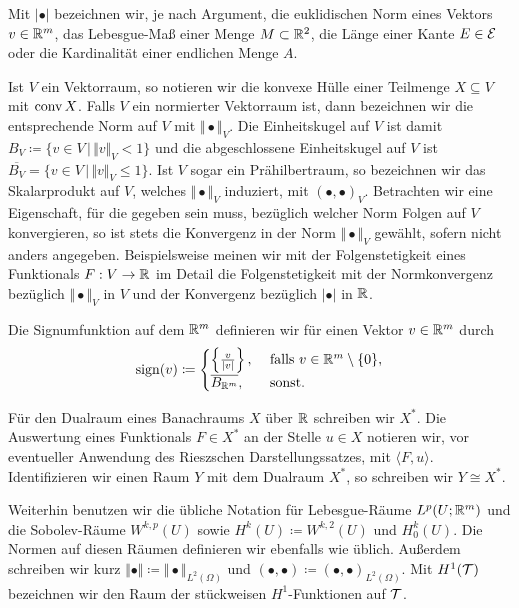 Mit $|\bullet|$ bezeichnen wir, je nach Argument, die euklidischen Norm eines
Vektors $v\in\mathbb{R}^m$, das Lebesgue-Maß einer Menge $M\subset\mathbb{R}^2$, die Länge
einer Kante $E\in\mathcal{E}$ oder die Kardinalität einer endlichen Menge $A$.

Ist $V$ ein Vektorraum, so notieren wir die konvexe Hülle einer Teilmenge
$X\subseteq V$ mit $\textup{conv}\,X$.
Falls $V$ ein normierter Vektorraum ist, dann bezeichnen wir die entsprechende
Norm auf $V$ mit $\Vert\bullet\Vert_V$. 
Die Einheitskugel auf $V$ ist damit $B_V\coloneqq\{v\in V\,|\, \Vert v\Vert_V<
1\}$ und die abgeschlossene Einheitskugel auf $V$ ist
$\overline{B_V}=\{v\in V\,|\, \Vert v\Vert_V\leq 1\}$.
Ist $V$ sogar ein Prähilbertraum, so bezeichnen wir das Skalarprodukt auf
$V$, welches $\Vert\bullet\Vert_V$ induziert, mit $(\bullet,\bullet)_V$.
Betrachten wir eine Eigenschaft, für die gegeben sein muss, bezüglich welcher
Norm Folgen auf $V$ konvergieren, so ist stets die Konvergenz in der Norm
$\Vert\bullet\Vert_V$ gewählt, sofern nicht anders angegeben.
Beispielsweise meinen wir mit der Folgenstetigkeit eines Funktionals
$F:V\to\mathbb{R}$ im Detail die Folgenstetigkeit mit der Normkonvergenz
bezüglich $\Vert\bullet\Vert_V$ in $V$ und der Konvergenz bezüglich $|\bullet|$
in $\mathbb{R}$.

Die Signumfunktion auf dem $\mathbb{R}^m$ definieren wir für einen Vektor
$v\in\mathbb{R}^m$ durch
\begin{align}
  \label{eq:signumFunction}
  \operatorname{sign}(v)\coloneqq
  \begin{cases}
    \left\{\frac{v}{|v|}\right\},&\text{ falls }v\in\mathbb{R}^m\setminus\{0\},\\
    \overline{B_{\mathbb{R}^m}},&\text{ sonst.}
  \end{cases}
\end{align}

Für den Dualraum eines Banachraums $X$ über $\mathbb{R}$ 
schreiben wir $X^\ast$. Die Auswertung eines Funktionals $F\in X^\ast$ an
der Stelle $u\in X$ notieren wir, vor eventueller 
Anwendung des Rieszschen Darstellungssatzes, mit $\langle F,u\rangle$.
Identifizieren wir einen Raum $Y$ mit dem Dualraum $X^\ast$, so schreiben
wir $Y\cong X^\ast$.

Weiterhin benutzen wir die übliche Notation für Lebesgue-Räume
$L^p\!\left(U;\mathbb{R}^m\right)$ und die So\-bo\-lev-Räume $W^{k,p}(U)$ sowie
$H^k(U)\coloneqq W^{k,2}(U)$ und $H^k_0(U)$. Die Normen auf diesen Räumen
definieren wir ebenfalls wie üblich.
Außerdem schreiben wir kurz $\Vert\bullet\Vert \coloneqq
\Vert\bullet\Vert_{L^2(\Omega)}$
und $(\bullet,\bullet)\coloneqq(\bullet,\bullet)_{L^2(\Omega)}$.
Mit $H^1(\mathcal{T})$ bezeichnen wir den Raum der stückweisen $H^1$-Funktionen auf
$\mathcal{T}$.


